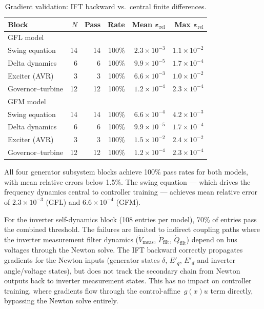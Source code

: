 \documentclass[11pt]{article}
\begin{document}
\begin{table}[t]
\centering
\caption{Gradient validation: IFT backward vs.\ central finite differences.}
\label{tab:grad}
\small
\begin{tabular}{lrrrrr}
\toprule
\textbf{Block} & \textbf{$N$} & \textbf{Pass} & \textbf{Rate} & \textbf{Mean} $\boldsymbol{\varepsilon_{\mathrm{rel}}}$ & \textbf{Max} $\boldsymbol{\varepsilon_{\mathrm{rel}}}$ \\
\midrule
\multicolumn{6}{l}{GFL model} \\
\quad Swing equation     & 14 & 14 & 100\% & $2.3\times10^{-3}$  & $1.1\times10^{-2}$ \\
\quad Delta dynamics     &  6 &  6 & 100\% & $9.9\times10^{-5}$  & $1.7\times10^{-4}$ \\
\quad Exciter (AVR)      &  3 &  3 & 100\% & $6.6\times10^{-3}$  & $1.0\times10^{-2}$ \\
\quad Governor--turbine  & 12 & 12 & 100\% & $1.2\times10^{-4}$  & $2.3\times10^{-4}$ \\
\midrule
\multicolumn{6}{l}{GFM model} \\
\quad Swing equation     & 14 & 14 & 100\% & $6.6\times10^{-4}$  & $4.2\times10^{-3}$ \\
\quad Delta dynamics     &  6 &  6 & 100\% & $9.9\times10^{-5}$  & $1.7\times10^{-4}$ \\
\quad Exciter (AVR)      &  3 &  3 & 100\% & $1.5\times10^{-2}$  & $2.4\times10^{-2}$ \\
\quad Governor--turbine  & 12 & 12 & 100\% & $1.2\times10^{-4}$  & $2.3\times10^{-4}$ \\
\bottomrule
\end{tabular}
\end{table}

All four generator subsystem blocks achieve 100\% pass rates for both
models, with mean relative errors below 1.5\%.  The swing equation ---
which drives the frequency dynamics central to controller training ---
achieves mean relative error of $2.3\times10^{-3}$ (GFL) and
$6.6\times10^{-4}$ (GFM).

For the inverter self-dynamics block (108 entries per model), 70\% of
entries pass the combined threshold.  The failures are limited to
indirect coupling paths where the inverter measurement filter dynamics
($\dot{V}_{\mathrm{meas}}$, $\dot{P}_{\mathrm{filt}}$,
$\dot{Q}_{\mathrm{filt}}$) depend on bus voltages through the Newton
solve.  The IFT backward correctly propagates gradients for the Newton
inputs (generator states $\delta$, $E'_q$, $E'_d$ and inverter
angle/voltage states), but does not track the secondary chain from
Newton outputs back to inverter measurement states.  This has no impact
on controller training, where gradients flow through the
control-affine~$g(x)u$ term directly, bypassing the Newton solve
entirely.
\end{document}

